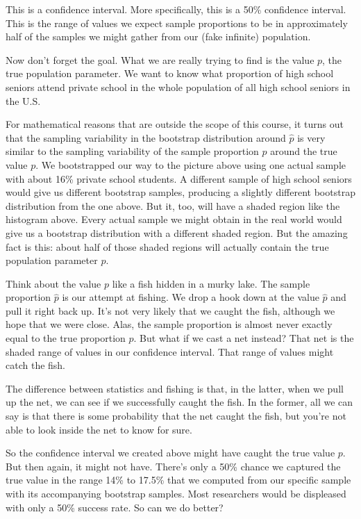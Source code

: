 \documentclass[
]{book}
\begin{document}
This is a confidence interval. More specifically, this is a 50\% confidence interval. This is the range of values we expect sample proportions to be in approximately half of the samples we might gather from our (fake infinite) population.

Now don't forget the goal. What we are really trying to find is the value \(p\), the true population parameter. We want to know what proportion of high school seniors attend private school in the whole population of all high school seniors in the U.S.

For mathematical reasons that are outside the scope of this course, it turns out that the sampling variability in the bootstrap distribution around \(\hat{p}\) is very similar to the sampling variability of the sample proportion \(\hat{p}\) around the true value \(p\). We bootstrapped our way to the picture above using one actual sample with about 16\% private school students. A different sample of high school seniors would give us different bootstrap samples, producing a slightly different bootstrap distribution from the one above. But it, too, will have a shaded region like the histogram above. Every actual sample we might obtain in the real world would give us a bootstrap distribution with a different shaded region. But the amazing fact is this: about half of those shaded regions will actually contain the true population parameter \(p\).

Think about the value \(p\) like a fish hidden in a murky lake. The sample proportion \(\hat{p}\) is our attempt at fishing. We drop a hook down at the value \(\hat{p}\) and pull it right back up. It's not very likely that we caught the fish, although we hope that we were close. Alas, the sample proportion is almost never exactly equal to the true proportion \(p\). But what if we cast a net instead? That net is the shaded range of values in our confidence interval. That range of values might catch the fish.

The difference between statistics and fishing is that, in the latter, when we pull up the net, we can see if we successfully caught the fish. In the former, all we can say is that there is some probability that the net caught the fish, but you're not able to look inside the net to know for sure.

So the confidence interval we created above might have caught the true value \(p\). But then again, it might not have. There's only a 50\% chance we captured the true value in the range 14\% to 17.5\% that we computed from our specific sample with its accompanying bootstrap samples. Most researchers would be displeased with only a 50\% success rate. So can we do better?
\end{document}

